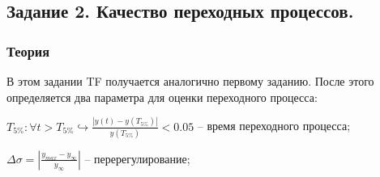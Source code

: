 \documentclass[16pt]{article}
\begin{document}
\pagebreak
\subsection{Задание 2. Качество переходных процессов.}
\subsubsection{Теория}
В этом задании TF получается аналогично первому заданию. После этого определяется два параметра для оценки переходного процесса:
\itemize
\item \(T_{5\%} : \forall t > T_{5\%} \hookrightarrow \frac{|y(t) - y(T_{5\%})|}{y(T_{5\%})} < 0.05\) -- время переходного процесса;
\item \(\Delta\sigma = |\frac{y_{max} - y_\infty}{y_\infty}|\) -- перерегулирование;
\end{document}
